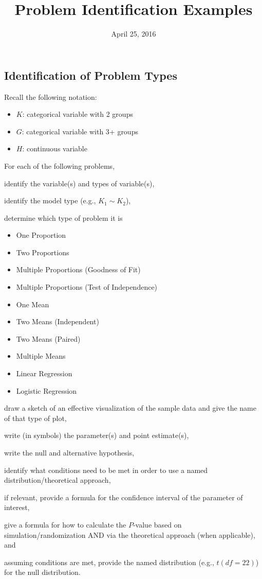\documentclass[]{article}
\title{Problem Identification Examples}
\author{}
\date{April 25, 2016}
\providecommand{\tightlist}{%
  \setlength{\itemsep}{0pt}\setlength{\parskip}{0pt}}
\newenvironment{tight_enumerate}{ \begin{enumerate}[A)] \setlength{\itemsep}{0pt} \setlength{\parskip}{0pt}}{\end{enumerate}}
\begin{document}
\maketitle

\subsection{Identification of Problem
Types}\label{identification-of-problem-types}

Recall the following notation:

\begin{itemize}
\tightlist
\item
  \(K\): categorical variable with 2 groups
\item
  \(G\): categorical variable with 3+ groups
\item
  \(H\): continuous variable
\end{itemize}

For each of the following problems,

\begin{tight_enumerate}
  \item identify the variable(s) and types of variable(s),
  \item identify the model type (e.g., $K_1 \sim K_2$),
  \item determine which type of problem it is 
  \begin{itemize}
    \item One Proportion
    \item Two Proportions
    \item Multiple Proportions (Goodness of Fit)
    \item Multiple Proportions (Test of Independence)
    \item One Mean
    \item Two Means (Independent)
    \item Two Means (Paired)
    \item Multiple Means
    \item Linear Regression
    \item Logistic Regression
  \end{itemize}
  \item draw a sketch of an effective visualization of the sample data and give the name of that type of plot,
  \item write (in symbols) the parameter(s) and point estimate(s),
  \item write the null and alternative hypothesis,
  \item identify what conditions need to be met in order to use a named distribution/theoretical approach,
  \item if relevant, provide a formula for the confidence interval of the parameter of interest,
  \item give a formula for how to calculate the $P$-value based on simulation/randomization AND via the theoretical approach (when applicable), and 
  \item assuming conditions are met, provide the named distribution (e.g., $t(df = 22)$) for the null distribution.
\end{tight_enumerate}
\end{document}
